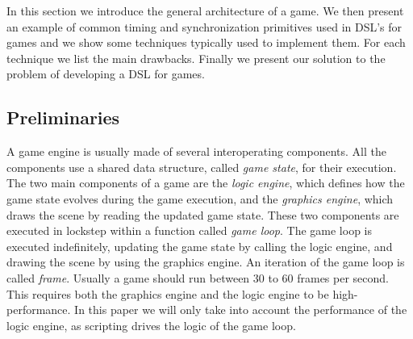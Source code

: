 In this section we introduce the general architecture of a game. We then present an example of common timing and synchronization primitives used in DSL's for games and we show some techniques typically used to implement them. For each technique we list the main drawbacks. Finally we present our solution to the problem of developing a DSL for games.

\subsection{Preliminaries}
A game engine is usually made of several interoperating components. All the components use a shared data structure, called \textit{game state}, for their execution. The two main components of a game are the \textit{logic engine}, which defines how the game state evolves during the game execution, and the \textit{graphics engine}, which draws the scene by reading the updated game state. These two components are executed in lockstep within a function called \textit{game loop}. The game loop is executed indefinitely, updating the game state by calling the logic engine, and drawing the scene by using the graphics engine. An iteration of the game loop is called \textit{frame}. Usually a game should run between 30 to 60 frames per second. This requires both the graphics engine and the logic engine to be high-performance. In this paper we will only take into account the performance of the logic engine, as scripting drives the logic of the game loop.

